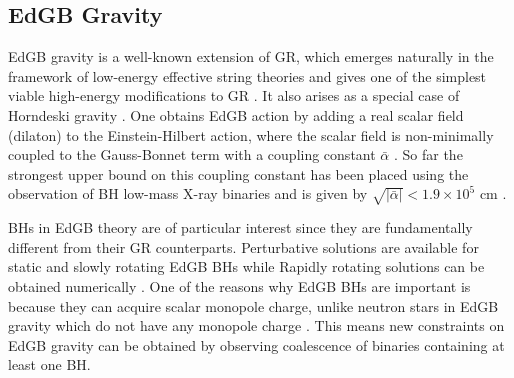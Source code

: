 \documentclass[prd,twocolumn,nofootinbib]{revtex4-1}
\begin{document}
 
  \subsection{EdGB Gravity}
EdGB gravity is a well-known extension of GR, which emerges naturally in the framework of low-energy effective string theories  and gives one of the simplest viable high-energy modifications to GR \cite{Moura:2006pz,Pani:2009wy}. It also arises as a special case of Horndeski gravity \cite{Zhang:2017unx,Berti:2015itd}. One obtains EdGB action by adding a real scalar field (dilaton) to the Einstein-Hilbert action, where the scalar field is non-minimally coupled to the Gauss-Bonnet term with a coupling constant $\bar{\alpha}$ \cite{Kanti:1995vq}. So far the strongest upper bound on this coupling constant has been placed using the observation of  BH low-mass X-ray binaries and is given by $\sqrt{|\bar{\alpha}|} < 1.9\times10^5$ cm \cite{Yagi:2012gp}.


BHs in EdGB theory are of particular interest since they are fundamentally different from their GR counterparts. Perturbative solutions are available for static and slowly rotating EdGB BHs while Rapidly rotating solutions can be obtained numerically             
 \cite{Berti:2015itd,Kleihaus:2011tg,Pani:2011gy}. One of the reasons why EdGB BHs are important is because they can acquire scalar monopole charge, unlike neutron stars in EdGB gravity which do not have any monopole charge \cite{Yagi:2011xp}. This means new constraints on EdGB gravity can be obtained by observing coalescence of binaries containing at least one BH.

 
\end{document}
